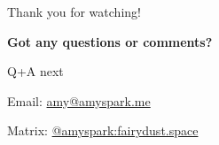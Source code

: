 \documentclass[aspectratio=169,usepdftitle=false]{fireshonks}
\begin{document}
\begin{frame}{Thank you for watching!}
    \begin{center}
        {
            \large
            \textbf{Got any questions or comments?}
        }

        Q+A next

        Email: \href{mailto:amy@amyspark.me?subject="FireShonks 2023"}{amy@amyspark.me}

        Matrix: \href{https://matrix.to/\#/@amyspark:fairydust.space}{@amyspark:fairydust.space}
    \end{center}
\end{frame}
\begin{frame}{\bibname}
    \printbibliography[heading=none]
\end{frame}
\end{document}
